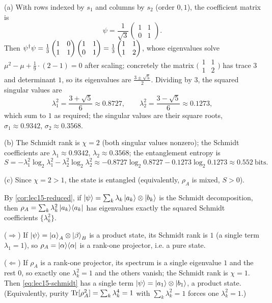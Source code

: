 \begin{solution}
(a) With rows indexed by $s_1$ and columns by $s_2$ (order $0,1$), the coefficient
matrix is
\[
  \psi=\frac{1}{\sqrt3}\begin{pmatrix}1&1\\0&1\end{pmatrix}.
\]
Then
$\psi^{\dagger}\psi=\tfrac13\begin{pmatrix}1&0\\1&1\end{pmatrix}\begin{pmatrix}1&1\\0&1\end{pmatrix}
=\tfrac13\begin{pmatrix}1&1\\1&2\end{pmatrix}$, whose eigenvalues solve
$\mu^{2}-\mu+\tfrac19\cdot(2-1)=0$ after scaling; concretely the matrix
$\bigl(\begin{smallmatrix}1&1\\1&2\end{smallmatrix}\bigr)$ has trace $3$ and
determinant $1$, so its eigenvalues are $\tfrac{3\pm\sqrt5}{2}$. Dividing by $3$,
the squared singular values are
\[
  \lambda_1^{2}=\frac{3+\sqrt5}{6}\approx0.8727,\qquad
  \lambda_2^{2}=\frac{3-\sqrt5}{6}\approx0.1273,
\]
which sum to $1$ as required; the singular values are their square roots,
$\sigma_1\approx0.9342$, $\sigma_2\approx0.3568$.

(b) The Schmidt rank is $\chi=2$ (both singular values nonzero); the Schmidt
coefficients are $\lambda_1\approx0.9342$, $\lambda_2\approx0.3568$; the
entanglement entropy is
\[
  S=-\lambda_1^{2}\log_2\lambda_1^{2}-\lambda_2^{2}\log_2\lambda_2^{2}
   \approx-0.8727\log_2 0.8727-0.1273\log_2 0.1273\approx0.552\ \text{bits}.
\]

(c) Since $\chi=2>1$, the state is entangled (equivalently, $\rho_A$ is mixed,
$S>0$).
\end{solution}

\begin{solution}
By \cref{cor:lec15-reduced}, if $\ket{\psi}=\sum_k\lambda_k\ket{a_k}\otimes\ket{b_k}$
is the Schmidt decomposition, then $\rho_A=\sum_k\lambda_k^{2}\ket{a_k}\!\bra{a_k}$ has
eigenvalues exactly the squared Schmidt coefficients $\{\lambda_k^{2}\}$.

($\Rightarrow$) If $\ket{\psi}=\ket{\alpha}_A\otimes\ket{\beta}_B$ is a product
state, its Schmidt rank is $1$ (a single term $\lambda_1=1$), so
$\rho_A=\ket{\alpha}\!\bra{\alpha}$ is a rank-one projector, i.e. a pure state.

($\Leftarrow$) If $\rho_A$ is a rank-one projector, its spectrum is a single
eigenvalue $1$ and the rest $0$, so exactly one $\lambda_k^{2}=1$ and the others
vanish; the Schmidt rank is $\chi=1$. Then \eqref{eq:lec15-schmidt} has a single
term $\ket{\psi}=\ket{a_1}\otimes\ket{b_1}$, a product state. (Equivalently,
purity $\operatorname{Tr}[\rho_A^{2}]=\sum_k\lambda_k^{4}=1$ with $\sum_k\lambda_k^{2}=1$ forces
one $\lambda_k^{2}=1$.)
\end{solution}

